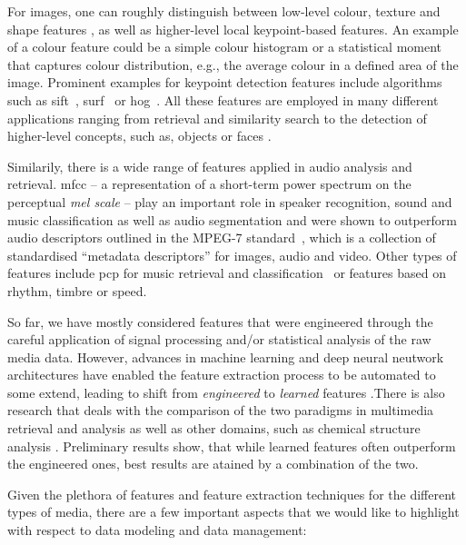 For images, one can roughly distinguish between low-level colour, texture and shape features \cite{Salau:2019Feature}, as well as higher-level local keypoint-based features. An example of a colour feature could be a simple colour histogram or a statistical moment that captures colour distribution, e.g., the average colour in a defined area of the image. Prominent examples for keypoint detection features include algorithms such as \acrfull{sift}~\cite{Lowe:1999object}, \acrfull{surf}~\cite{Bay:2006surf} or \acrfull{hog}~\cite{Dalal:2005Histograms}. All these features are employed in many different applications ranging from retrieval and similarity search to the detection of higher-level concepts, such as, objects or faces \cite{Deniz:2011Face, Farooq:2016Object}.

Similarily, there is a wide range of features applied in audio analysis and retrieval. \acrfull{mfcc} -- a representation of a short-term power spectrum on the perceptual \emph{mel scale} -- play an important role in speaker recognition, sound and music classification as well as audio segmentation \cite{Kim:2010Comparison} and were shown to outperform audio descriptors outlined in the MPEG-7 standard~\cite{Quackenbush:2001Overview}, which is a collection of standardised ``metadata descriptors'' for images, audio and video. Other types of features include \acrfull{pcp} for music retrieval and classification~\cite{Lee:2006Automatic,Demirel:2019Automatic} or features based on rhythm, timbre or speed.

So far, we have mostly considered features that were engineered through the careful application of signal processing and/or statistical analysis of the raw media data. However, advances in machine learning and deep neural neutwork architectures have enabled the feature extraction process to be automated to some extend, leading to shift from  \emph{engineered} to \emph{learned} features \cite{Hamel:2010Learning,Gordo:2016Deep}.There is also research that deals with the comparison of the two paradigms in multimedia retrieval and analysis \cite{Budnik:2017learned} as well as other domains, such as chemical structure analysis \cite{Gallegos:2021importance}. Preliminary results show, that while learned features often outperform the engineered ones, best results are atained by a combination of the two.

Given the plethora of features and feature extraction techniques for the different types of media, there are a few important aspects that we would like to highlight with respect to data modeling and data management:

